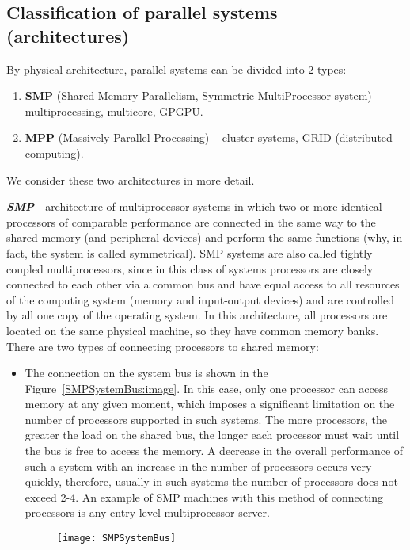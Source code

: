 { %
	\subsection{Classification of parallel systems (architectures)}
	\par By physical architecture, parallel systems can be divided into 2 types:
		\begin{enumerate}
			\item\textbf{SMP} (Shared Memory Parallelism, Symmetric MultiProcessor system)~– multiprocessing, multicore, GPGPU. 
			\item\textbf{MPP} (Massively Parallel Processing) – cluster systems, GRID (distributed computing).
		\end{enumerate}
	\par We consider these two architectures in more detail.
	\par\textbf{\textit{SMP}}  - architecture of multiprocessor systems in which two or more identical processors of comparable performance are connected in the same way to the shared memory (and peripheral devices) and perform the same functions (why, in fact, the system is called symmetrical). SMP systems are also called tightly coupled multiprocessors, since in this class of systems processors are closely connected to each other via a common bus and have equal access to all resources of the computing system (memory and input-output devices) and are controlled by all one copy of the operating system. In this architecture, all processors are located on the same physical machine, so they have common memory banks. There are two types of connecting processors to shared memory:
		\begin{itemize}
			\item The connection on the system bus is shown in the Figure~\ref{SMPSystemBus:image}. In this case, only one processor can access memory at any given moment, which imposes a significant limitation on the number of processors supported in such systems. The more processors, the greater the load on the shared bus, the longer each processor must wait until the bus is free to access the memory. A decrease in the overall performance of such a system with an increase in the number of processors occurs very quickly, therefore, usually in such systems the number of processors does not exceed 2-4. An example of SMP machines with this method of connecting processors is any entry-level multiprocessor server.
				\begin{figure}[H]
					\texttt{[image: SMPSystemBus]}

\end{figure}
\end{itemize}}
